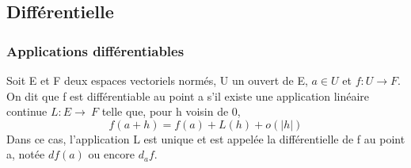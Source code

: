 \subsection{Différentielle}
%
\subsubsection{Applications différentiables}
%
\begin{de}
Soit E et F deux espaces vectoriels normés, U un
ouvert de E, $a \in U$ et $f : U \rightarrow F$. On dit que f est différentiable au
point a s'il existe une application linéaire continue $L : E \rightarrow~ F$ telle
que, pour h voisin de 0,
\[
f(a + h) = f(a) + L(h) +
o(|h|)
\]
Dans ce cas, l'application L est unique et est appelée la différentielle
de f au point a, notée $df(a)$ ou encore $d_a f$.
\end{de}
%
%
%
%
%
%
%
%

